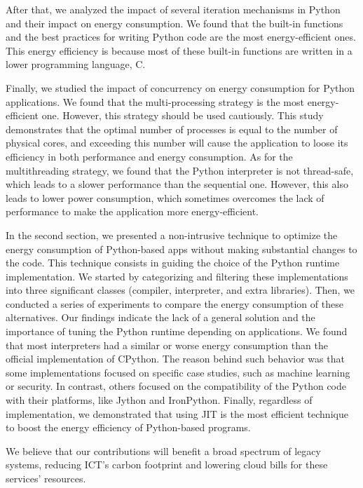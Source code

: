After that, we analyzed the impact of several iteration mechanisms in Python and their impact on energy consumption.
We found that the built-in functions and the best practices for writing Python code are the most energy-efficient ones.
This energy efficiency is because most of these built-in functions are written in a lower programming language, C.

Finally, we studied the impact of concurrency on energy consumption for Python applications.
 We found that the multi-processing strategy is the most energy-efficient one.
 However, this strategy should be used cautiously.
 This study demonstrates that the optimal number of processes is equal to the number of physical cores, and exceeding this number will cause the application to loose its efficiency in both performance and energy consumption.
 As for the multithreading strategy, we found that the Python interpreter is not thread-safe, which leads to a slower performance than the sequential one.
 However, this also leads to lower power consumption, which sometimes overcomes the lack of performance to make the application more energy-efficient.

In the second section, we presented a non-intrusive technique to optimize the energy consumption of Python-based apps without making substantial changes to the code.
This technique consists in guiding the choice of the Python runtime implementation.
We started by categorizing and filtering these implementations into three significant classes (compiler, interpreter, and extra libraries).
Then, we conducted a series of experiments to compare the energy consumption of these alternatives.
Our findings indicate the lack of a general solution and the importance of tuning the Python runtime depending on applications.
We found that most interpreters had a similar or worse energy consumption than the official implementation of CPython.
The reason behind such behavior was that some implementations focused on specific case studies, such as machine learning or security.
In contrast, others focused on the compatibility of the Python code with their platforms, like Jython and IronPython.
Finally, regardless of implementation, we demonstrated that using JIT is the most efficient technique to boost the energy efficiency of Python-based programs.

We believe that our contributions will benefit a broad spectrum of legacy systems, reducing ICT's carbon footprint and lowering cloud bills for these services' resources.